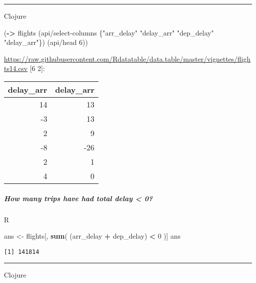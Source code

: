 \documentclass[]{article}
\newenvironment{Shaded}{\begin{snugshade}}{\end{snugshade}}
\newcommand{\KeywordTok}[1]{\textcolor[rgb]{0.13,0.29,0.53}{\textbf{#1}}}
\newcommand{\DecValTok}[1]{\textcolor[rgb]{0.00,0.00,0.81}{#1}}
\newcommand{\FloatTok}[1]{\textcolor[rgb]{0.00,0.00,0.81}{#1}}
\newcommand{\StringTok}[1]{\textcolor[rgb]{0.31,0.60,0.02}{#1}}
\newcommand{\VariableTok}[1]{\textcolor[rgb]{0.00,0.00,0.00}{#1}}
\newcommand{\OperatorTok}[1]{\textcolor[rgb]{0.81,0.36,0.00}{\textbf{#1}}}
\newcommand{\NormalTok}[1]{#1}
\let\oldsubparagraph\subparagraph
\renewcommand{\subparagraph}[1]{\oldsubparagraph{#1}\mbox{}}
\begin{document}
\begin{center}\rule{0.5\linewidth}{0.5pt}\end{center}

Clojure

\begin{Shaded}
\begin{Highlighting}[]
\NormalTok{(}\KeywordTok{->}\NormalTok{ flights}
\NormalTok{    (api/select-columns \{}\StringTok{"arr_delay"} \StringTok{"delay_arr"}
                         \StringTok{"dep_delay"} \StringTok{"delay_arr"}\NormalTok{\})}
\NormalTok{    (api/head }\DecValTok{6}\NormalTok{))}
\end{Highlighting}
\end{Shaded}

\url{https://raw.githubusercontent.com/Rdatatable/data.table/master/vignettes/flights14.csv}
{[}6 2{]}:

\begin{longtable}[]{@{}rr@{}}
\toprule
delay\_arr & delay\_arr\tabularnewline
\midrule
\endhead
14 & 13\tabularnewline
-3 & 13\tabularnewline
2 & 9\tabularnewline
-8 & -26\tabularnewline
2 & 1\tabularnewline
4 & 0\tabularnewline
\bottomrule
\end{longtable}

\subparagraph{How many trips have had total delay \textless{}
0?}\label{how-many-trips-have-had-total-delay-0}

R

\begin{Shaded}
\begin{Highlighting}[]
\NormalTok{ans <-}\StringTok{ }\NormalTok{flights[, }\KeywordTok{sum}\NormalTok{( (arr_delay }\OperatorTok{+}\StringTok{ }\NormalTok{dep_delay) }\OperatorTok{<}\StringTok{ }\DecValTok{0}\NormalTok{ )]}
\NormalTok{ans}
\end{Highlighting}
\end{Shaded}

\begin{verbatim}
[1] 141814
\end{verbatim}

\begin{center}\rule{0.5\linewidth}{0.5pt}\end{center}

Clojure

\begin{Shaded}
\end{Shaded}
\end{document}
